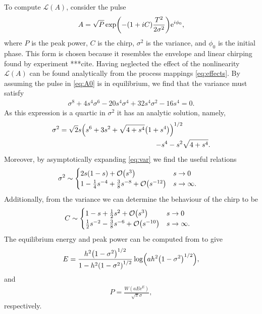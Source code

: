 \documentclass[10pt,twocolumn,a4paper]{article}
\let\originalleft\left
\let\originalright\right
\renewcommand{\left}{\mathopen{}\mathclose\bgroup\originalleft}
\renewcommand{\right}{\aftergroup\egroup\originalright}
\providecommand{\bigO}[1]{\ensuremath{\mathop{}\mathopen{}\mathcal{O}\mathopen{}\left(#1\right)}}
\begin{document}
To compute $\mathcal{L}(A)$, consider the pulse
\begin{align}
	A = \sqrt{P} \exp \left( -(1 + iC) \frac{T^2}{2 \sigma^2} \right) \textrm{e}^{i \phi_0},
	\label{eq:A0}
\end{align}
where $P$ is the peak power, $C$ is the chirp, $\sigma^2$ is the variance, and $\phi_0$ is the initial phase. This form is chosen because it resembles the envelope and linear chirping found by experiment ***cite. Having neglected the effect of the nonlinearity $\mathcal{L}(A)$ can be found analytically from the process mappings \eqref{eq:effects}. By assuming the pulse in \eqref{eq:A0} is in equilibrium, we find that the variance must satisfy
\begin{align}
	\sigma^8 + 4 s^4 \sigma^6 - 20 s^4 \sigma^4 + 32 s^4 \sigma^2 - 16 s^4 = 0.
	\label{eq:var}
\end{align}
As this expression is a quartic in $\sigma^2$ it has an analytic solution, namely,
\begin{equation}
	\begin{split}
		\sigma^2 = \sqrt{2} s \left( s^6 + 3s^2 + \sqrt{4 + s^4} \left( 1 + s^4 \right) \right)^{1/2} & \\
		- s^4 - s^2 & \sqrt{4 + s^4}.
		\label{eq:equilvar}
	\end{split}
\end{equation}
Moreover, by asymptotically expanding \eqref{eq:var} we find the useful relations
\begin{align}
	\sigma^2 &\sim
	\begin{cases}
		2s(1 - s) + \bigO{s^3} & s \rightarrow 0 \\
		1 - \frac{1}{4}s^{-4} + \frac{3}{8}s^{-8} + \bigO{s^{-12}} & s \rightarrow \infty.
	\end{cases}
\end{align}
Additionally, from the variance we can determine the behaviour of the chirp to be
\begin{align}
	C &\sim
	\begin{cases}
		1 - s + \frac{1}{2}s^2 + \bigO{s^3} & s \rightarrow 0 \\
		\frac{1}{2}s^{-2} - \frac{3}{8}s^{-6} + \bigO{s^{-10}} & s \rightarrow \infty.
	\end{cases}
\end{align}
The equilibrium energy and peak power can be computed from \label{eq:energy} to give
\begin{align}
	E = \frac{h^2 \left( 1 - \sigma^2 \right)^{1/2}}{1 - h^2 \left( 1 - \sigma^2 \right)^{1/2}} \log \left( a h^2 \left( 1 - \sigma^2 \right)^{1/2} \right),
\end{align}
and
\begin{align}
	P = \frac{W(a E \textrm{e}^E)}{\sqrt{\pi} \sigma},
	\label{eq:equilpower}
\end{align}
respectively.
\end{document}
